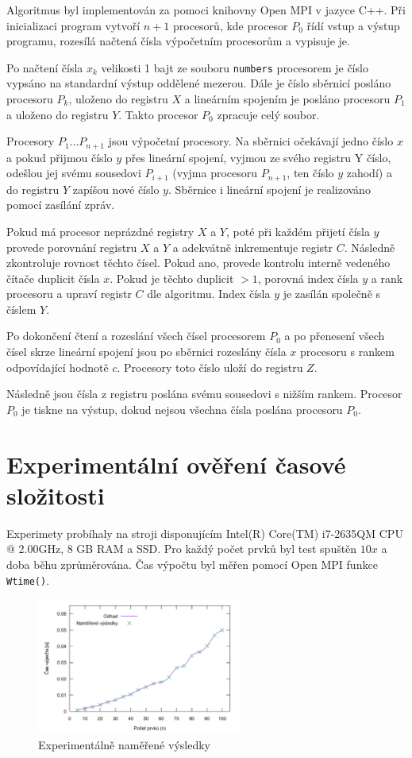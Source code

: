 \documentclass[11pt,a4paper]{article}
\begin{document}
Algoritmus byl implementován za pomoci knihovny Open MPI v jazyce C++. Při inicializaci program vytvoří $n+1$ procesorů, kde procesor $P_0$ řídí vstup a výstup programu, rozesílá načtená čísla výpočetním procesorům a vypisuje je.

Po načtení čísla $x_k$ velikosti 1 bajt ze souboru \texttt{numbers} procesorem je číslo vypsáno na standardní výstup oddělené mezerou. Dále je číslo sběrnicí posláno procesoru $P_k$, uloženo do registru $X$ a lineárním spojením je posláno procesoru $P_1$ a uloženo do registru $Y$. Takto procesor $P_0$ zpracuje celý soubor.

Procesory $P_1 ... P_{n+1}$ jsou výpočetní procesory. Na sběrnici očekávají jedno číslo $x$ a pokud přijmou číslo $y$ přes lineární spojení, vyjmou ze svého registru Y číslo, odešlou jej svému sousedovi $P_{i+1}$ (vyjma procesoru $P_{n+1}$, ten číslo $y$ zahodí) a do registru $Y$ zapíšou nové číslo $y$. Sběrnice i lineární spojení je realizováno pomocí zasílání zpráv.

Pokud má procesor neprázdné registry $X$ a $Y$, poté při každém přijetí čísla $y$ provede porovnání registru $X$ a $Y$ a adekvátně inkrementuje registr $C$. Následně zkontroluje rovnost těchto čísel. Pokud ano, provede kontrolu interně vedeného čítače duplicit čísla $x$. Pokud je těchto duplicit $>1$, porovná index čísla $y$ a rank procesoru a upraví registr $C$ dle algoritmu. Index čísla $y$ je zasílán společně s číslem $Y$.

Po dokončení čtení a rozeslání všech čísel procesorem $P_0$ a po přenesení všech čísel skrze lineární spojení jsou po sběrnici rozeslány čísla $x$ procesoru s rankem odpovídající hodnotě $c$. Procesory toto číslo uloží do registru $Z$.

Následně jsou čísla z registru poslána svému sousedovi s nižším rankem. Procesor $P_0$ je tiskne na výstup, dokud nejsou všechna čísla poslána procesoru $P_0$.

\section{Experimentální ověření časové složitosti}

Experimety probíhaly na stroji disponujícím Intel(R) Core(TM) i7-2635QM CPU @ 2.00GHz, 8 GB RAM a SSD. Pro každý počet prvků byl test spuštěn $10x$ a doba běhu zprůměrována. Čas výpočtu byl měřen pomocí Open MPI funkce \texttt{Wtime()}.

\begin{figure}[!ht]
    \centering
		\includegraphics[width=0.6\textwidth]{results}
    \caption{Experimentálně naměřené výsledky}
\end{figure}
\end{document}
